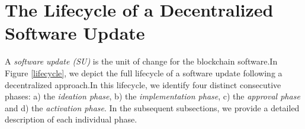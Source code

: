 \section{The Lifecycle of a Decentralized Software Update}
A \emph{software update (SU)} is the unit of change for the blockchain software.In Figure \ref{lifecycle}, we depict 
the full lifecycle of a software update following a decentralized approach.In this lifecycle, we identify four distinct consecutive phases: a) the \emph{ideation phase}, b) the \emph{implementation phase}, c) the \emph{approval phase} and d) the \emph{activation phase}.%
 In the subsequent subsections, we provide a detailed description of each individual phase.


